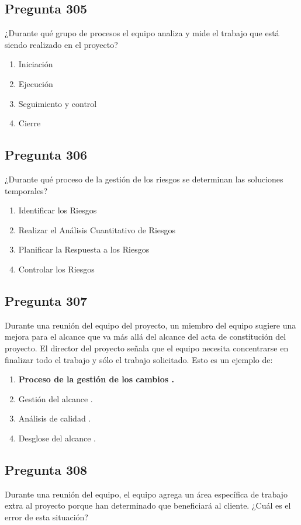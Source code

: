 \documentclass[11pt,a4paper]{article}
\begin{document}
\subsection*{Pregunta 305}
¿Durante qué grupo de procesos el equipo analiza y mide el trabajo que está siendo realizado en el proyecto?

\begin{enumerate}[label=\alph*)]
  \item Iniciación
  \item Ejecución
  \item Seguimiento y control
  \item Cierre
\end{enumerate}

\subsection*{Pregunta 306}
¿Durante qué proceso de la gestión de los riesgos se determinan las soluciones temporales?

\begin{enumerate}[label=\alph*)]
  \item Identificar los Riesgos
  \item Realizar el Análisis Cuantitativo de Riesgos
  \item Planificar la Respuesta a los Riesgos
  \item Controlar los Riesgos
\end{enumerate}

\subsection*{Pregunta 307}
Durante una reunión del equipo del proyecto, un miembro del equipo sugiere una mejora para el alcance que va más allá del alcance del acta de constitución del proyecto. El director del proyecto señala que el equipo necesita concentrarse en finalizar todo el trabajo y sólo el trabajo solicitado. Esto es un ejemplo de:

\begin{enumerate}[label=\alph*)]
  \item \textbf{Proceso de la gestión de los cambios .}
  \item Gestión del alcance .
  \item Análisis de calidad .
  \item Desglose del alcance .
\end{enumerate}

\subsection*{Pregunta 308}
Durante una reunión del equipo, el equipo agrega un área específica de trabajo extra al proyecto porque han determinado que beneficiará al cliente. ¿Cuál es el error de esta situación?
\end{document}
